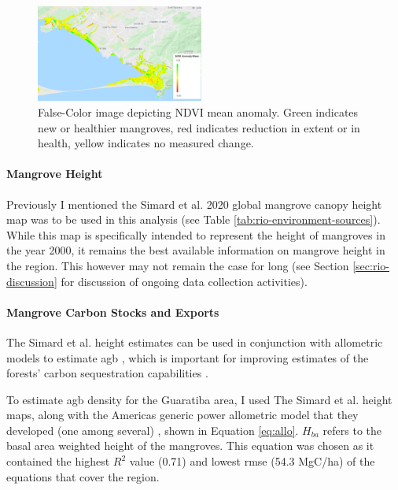 \begin{figure}[H] 
\centering
\includegraphics[width=0.49\textwidth]{Figures/chap4/guaratiba_anomaly.png}
\caption[False-Color image depicting NDVI mean anomaly]{False-Color image depicting NDVI mean anomaly. Green indicates new or healthier mangroves, red indicates reduction in extent or in health, yellow indicates no measured change.}
\label{fig:anomaly}
\end{figure}

\paragraph{Mangrove Height} \label{sec:rio-mangrove-height} \leavevmode\newline

Previously I mentioned the Simard et al. 2020 global mangrove canopy height map was to be used in this analysis (see Table \ref{tab:rio-environment-sources}). While this map is specifically intended to represent the height of mangroves in the year 2000, it remains the best available information on mangrove height in the region. This however may not remain the case for long (see Section \ref{sec:rio-discussion} for discussion of ongoing data collection activities).

\paragraph{Mangrove Carbon Stocks and Exports} \label{sec:rio-mangrove-carbon} \leavevmode\newline

The Simard et al. height estimates can be used in conjunction with allometric models to estimate \ac{agb} \cite{cloughAllometricRelationshipsEstimating1989, fatoyinboEstimatingMangroveAboveground2018}, which is important for improving estimates of the forests' carbon sequestration capabilities \cite{lagomasinoMeasuringMangroveCarbon2019, simardMangroveCanopyHeight2019}.

To estimate \ac{agb} density for the Guaratiba area, I used The Simard et al. height maps, along with the Americas generic power allometric model that they developed (one among several) \cite{simardMangroveCanopyHeight2019}, shown in Equation \ref{eq:allo}. $H_{ba}$ refers to the basal area weighted height of the mangroves. This equation was chosen as it contained the highest $R^2$ value (0.71) and lowest \ac{rmse} (54.3 MgC/ha) of the equations that cover the region. 

